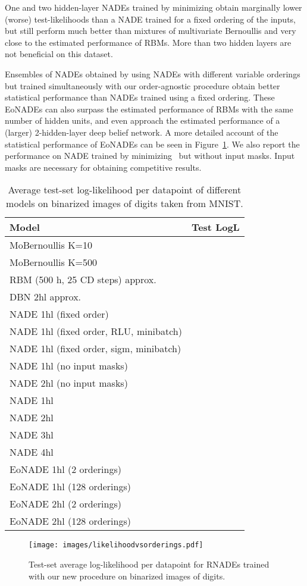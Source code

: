 \documentclass{article}
\begin{document}
One and two hidden-layer NADEs trained by minimizing  obtain marginally
lower (worse) test-likelihoods than a NADE trained for a fixed ordering of the
inputs, but still perform much better than mixtures of multivariate Bernoullis
and very close to the estimated performance of RBMs. More than two hidden layers
are not beneficial on this dataset.

Ensembles of NADEs obtained by using NADEs with different variable orderings but
trained simultaneously with our order-agnostic procedure obtain better
statistical performance than NADEs trained using a fixed ordering. These EoNADEs
can also surpass the estimated performance of RBMs with the same number of
hidden units, and even approach the estimated performance of a (larger)
2-hidden-layer deep belief network. A more detailed account of the statistical performance of
EoNADEs can be seen in Figure~\ref{fig:likelihood-vs-orderings}. We also report
the performance on NADE trained by minimizing~ but without input masks.
Input masks are necessary for obtaining competitive results.
\begin{table}
\begin{center}
\caption{Average test-set log-likelihood per datapoint of different models
on  binarized images of digits taken from MNIST\@.}
\label{tab:MNIST-results}
\medskip
\begin{tabular}{lc}
\toprule
{Model} & {Test LogL}\\
\midrule
MoBernoullis K=10 &  \\
MoBernoullis K=500 &  \\
RBM (500 h, 25 CD steps) approx. & \\
DBN 2hl approx. & \\
NADE 1hl (fixed order) &  \\
NADE 1hl (fixed order, RLU, minibatch) &  \\
NADE 1hl (fixed order, sigm, minibatch) &   \\
\hline
NADE 1hl (no input masks)&  \\
NADE 2hl (no input masks)&  \\
NADE 1hl &  \\
NADE 2hl &  \\
NADE 3hl &  \\
NADE 4hl &  \\
EoNADE 1hl (2 orderings) &  \\
EoNADE 1hl (128 orderings) &  \\
EoNADE 2hl (2 orderings) &  \\
EoNADE 2hl (128 orderings) &  \\
\bottomrule
\end{tabular}
\end{center}
\end{table}
\begin{figure}
\centerline{\texttt{[image: images/likelihoodvsorderings.pdf]}}
\caption{Test-set average log-likelihood per datapoint for RNADEs trained with
our new procedure on binarized images of digits.}
\label{fig:likelihood-vs-orderings}
\end{figure}
\end{document}

